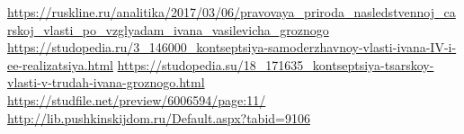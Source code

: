 \documentclass[12pt]{article}
\begin{document}
  \begin{thebibliography}{9}
     \url{https://ruskline.ru/analitika/2017/03/06/pravovaya_priroda_nasledstvennoj_carskoj_vlasti_po_vzglyadam_ivana_vasilevicha_groznogo}
     \url{https://studopedia.ru/3_146000_kontseptsiya-samoderzhavnoy-vlasti-ivana-IV-i-ee-realizatsiya.html}
     \url{https://studopedia.su/18_171635_kontseptsiya-tsarskoy-vlasti-v-trudah-ivana-groznogo.html}
     \url{https://studfile.net/preview/6006594/page:11/}
     \url{http://lib.pushkinskijdom.ru/Default.aspx?tabid=9106}
  \end{thebibliography}
\end{document}
